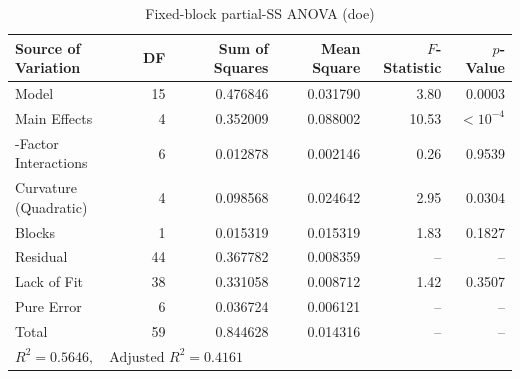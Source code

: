 \begin{table}[htbp]
\centering
\caption{Fixed-block partial-SS ANOVA (doe)}
\label{tab:anova_0_doe_val_loss}
\begin{tabular}{lrrrrr}
\hline
\textbf{Source of Variation} & \textbf{DF} & \textbf{Sum of Squares} & \textbf{Mean Square} & \textbf{$F$-Statistic} & \textbf{$p$-Value} \\
\hline
Model & 15 & 0.476846 & 0.031790 & 3.80 & 0.0003 \\
\quad Main Effects & 4 & 0.352009 & 0.088002 & 10.53 & $< 10^{-4}$ \\
\quad 2-Factor Interactions & 6 & 0.012878 & 0.002146 & 0.26 & 0.9539 \\
\quad Curvature (Quadratic) & 4 & 0.098568 & 0.024642 & 2.95 & 0.0304 \\
\quad Blocks & 1 & 0.015319 & 0.015319 & 1.83 & 0.1827 \\
Residual & 44 & 0.367782 & 0.008359 & -- & -- \\
\quad Lack of Fit & 38 & 0.331058 & 0.008712 & 1.42 & 0.3507 \\
\quad Pure Error & 6 & 0.036724 & 0.006121 & -- & -- \\
Total & 59 & 0.844628 & 0.014316 & -- & -- \\
\hline
\multicolumn{6}{l}{\small $R^2 = 0.5646, \quad \text{Adjusted } R^2 = 0.4161$} \\
\hline
\end{tabular}
\end{table}